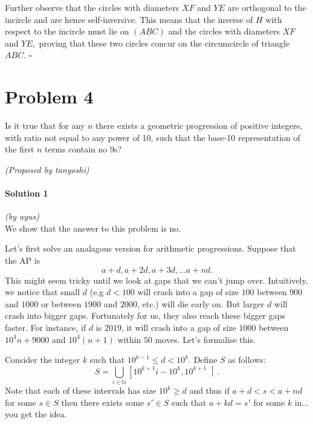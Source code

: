 \documentclass[10pt]{article}
\begin{document}
	Further observe that the circles with diameters $XF$ and $YE$ are orthogonal to the incircle and are hence self-inversive. This means that the inverse of $H$ with respect to the incircle must lie on $(ABC)$ and the circles with diameters $XF$ and $YE,$ proving that these two circles concur on the circumcircle of triangle $ABC.$ \hfill\ensuremath{\square}
	
	\newpage
	
	\section*{Problem 4}

	
	Is it true that for any \(n\) there exists a geometric progression of positive integers, with ratio not equal to any power of 10, such that the base-10 representation of the first \(n\) terms contain no $9$s?
	\begin{flushright}
	\textit{(Proposed by tanyoshi)}
	\end{flushright}
	
		\noindent \makebox[\linewidth]{\rule{\textwidth}{0.4pt}}	
	
	\paragraph{Solution 1} \textit{(by ayus)}\\
	
	\noindent We show that the answer to this problem is no.

	Let's first solve an analagous version for arithmetic progressions. Suppose that the AP is $$a+d,a+2d,a+3d,\ldots a+nd.$$
	This might seem tricky until we look at gaps that we can't jump over. Intuitively, we notice that small $d$ (e.g $d<100$ will crash into a gap of size $100$ between $900$ and $1000$ or between $1900$ and $2000$, etc.) will die early on. But larger $d$ will crash into bigger gaps. Fortunately for us, they also reach these bigger gaps faster. For instance, if $d$ is $2019$, it will crash into a gap of size $1000$ between $10^4n+9000$ and $10^4(n+1)$ within $50$ moves. Let's formalise this.
	
	Consider the integer $k$ such that $10^{k-1}\le d<10^k$. Define $S$ as follows: $$S=\bigcup_{i\in\mathbb{N}}\left[10^{k+1}i-10^k,10^{k+1} \right[.$$
	Note that each of these intervals has size $10^k\ge d$ and thus if $a+d<s<a+nd$ for some $s\in S$ then there exists some $s'\in S$ such that $a+kd=s'$ for some $k$ in... you get the idea.
	
\end{document}
